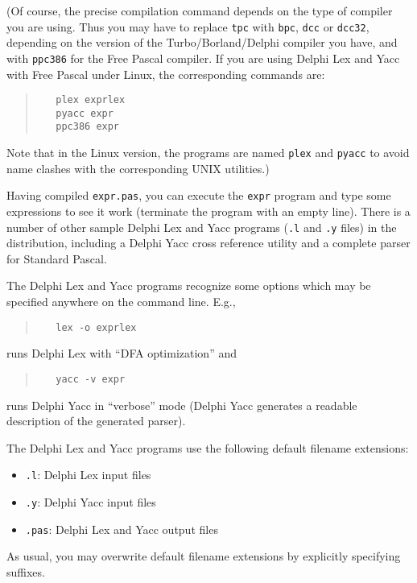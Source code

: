 \documentclass{article}
\begin{document}
(Of course, the precise compilation command depends on the type of compiler
you are using. Thus you may have to replace \verb"tpc" with \verb"bpc",
\verb"dcc" or \verb"dcc32", depending on the version of the
Turbo/Borland/Delphi compiler you have, and with \verb"ppc386" for the Free
Pascal compiler. If you are using Delphi Lex and Yacc with Free Pascal under
Linux, the corresponding commands are:
\begin{quote}\begin{verbatim}
   plex exprlex
   pyacc expr
   ppc386 expr
\end{verbatim}\end{quote}
Note that in the Linux version, the programs are named \verb"plex" and
\verb"pyacc" to avoid name clashes with the corresponding UNIX utilities.)

Having compiled \verb"expr.pas", you can execute the \verb"expr" program and
type some expressions to see it work (terminate the program with an empty
line).  There is a number of other sample Delphi Lex and Yacc programs (\verb".l"
and \verb".y" files) in the distribution, including a Delphi Yacc cross reference
utility and a complete parser for Standard Pascal.

The Delphi Lex and Yacc programs recognize some options which may be specified
anywhere on the command line. E.g.,
\begin{quote}\begin{verbatim}
   lex -o exprlex
\end{verbatim}\end{quote}
runs Delphi Lex with ``DFA optimization'' and
\begin{quote}\begin{verbatim}
   yacc -v expr
\end{verbatim}\end{quote}
runs Delphi Yacc in ``verbose'' mode (Delphi Yacc generates a readable description
of the generated parser).

The Delphi Lex and Yacc programs use the following default filename extensions:
\begin{itemize}
   \item \verb".l": Delphi Lex input files
   \item \verb".y": Delphi Yacc input files
   \item \verb".pas": Delphi Lex and Yacc output files
\end{itemize}
As usual, you may overwrite default filename extensions by explicitly
specifying suffixes.
\end{document}
